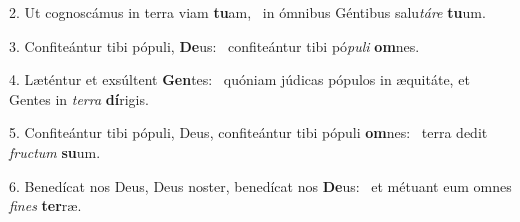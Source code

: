 2. Ut cognoscámus in terra viam \textbf{tu}am, \ast\  in ómnibus Géntibus salu\textit{tá}\textit{re} \textbf{tu}um.\

3. Confiteántur tibi pópuli, \textbf{De}us: \ast\  confiteántur tibi pó\textit{pu}\textit{li} \textbf{om}nes.\

4. Læténtur et exsúltent \textbf{Gen}tes: \ast\  quóniam júdicas pópulos in æquitáte, et Gentes in \textit{ter}\textit{ra} \textbf{dí}rigis.\

5. Confiteántur tibi pópuli, Deus, confiteántur tibi pópuli \textbf{om}nes: \ast\  terra dedit \textit{fruc}\textit{tum} \textbf{su}um.\

6. Benedícat nos Deus, Deus noster, benedícat nos \textbf{De}us: \ast\  et métuant eum omnes \textit{fi}\textit{nes} \textbf{ter}ræ.\

